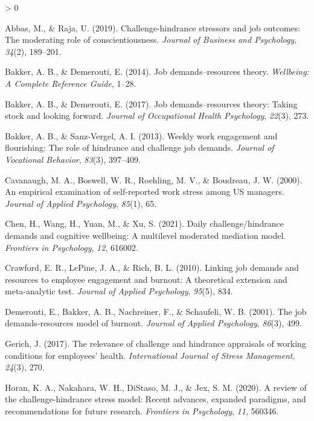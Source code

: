 \documentclass[
  english,
  man]{apa6}
\newlength{\cslhangindent}
\newenvironment{CSLReferences}[2] %
 {%
  \setlength{\parindent}{0pt}
  \ifodd #1 \everypar{\setlength{\hangindent}{\cslhangindent}}\ignorespaces\fi
  \ifnum #2 > 0
  \setlength{\parskip}{#2\baselineskip}
  \fi
 }%
 {}
\begin{document}
\hypertarget{refs}{}
\begin{CSLReferences}{1}{0}
\leavevmode\hypertarget{ref-abbas2019challenge}{}%
Abbas, M., \& Raja, U. (2019). Challenge-hindrance stressors and job outcomes: The moderating role of conscientiousness. \emph{Journal of Business and Psychology}, \emph{34}(2), 189--201.

\leavevmode\hypertarget{ref-bakker2014job}{}%
Bakker, A. B., \& Demerouti, E. (2014). Job demands--resources theory. \emph{Wellbeing: A Complete Reference Guide}, 1--28.

\leavevmode\hypertarget{ref-bakker2017job}{}%
Bakker, A. B., \& Demerouti, E. (2017). Job demands--resources theory: Taking stock and looking forward. \emph{Journal of Occupational Health Psychology}, \emph{22}(3), 273.

\leavevmode\hypertarget{ref-bakker2013weekly}{}%
Bakker, A. B., \& Sanz-Vergel, A. I. (2013). Weekly work engagement and flourishing: The role of hindrance and challenge job demands. \emph{Journal of Vocational Behavior}, \emph{83}(3), 397--409.

\leavevmode\hypertarget{ref-cavanaugh2000empirical}{}%
Cavanaugh, M. A., Boswell, W. R., Roehling, M. V., \& Boudreau, J. W. (2000). An empirical examination of self-reported work stress among US managers. \emph{Journal of Applied Psychology}, \emph{85}(1), 65.

\leavevmode\hypertarget{ref-chen2021daily}{}%
Chen, H., Wang, H., Yuan, M., \& Xu, S. (2021). Daily challenge/hindrance demands and cognitive wellbeing: A multilevel moderated mediation model. \emph{Frontiers in Psychology}, \emph{12}, 616002.

\leavevmode\hypertarget{ref-crawford2010linking}{}%
Crawford, E. R., LePine, J. A., \& Rich, B. L. (2010). Linking job demands and resources to employee engagement and burnout: A theoretical extension and meta-analytic test. \emph{Journal of Applied Psychology}, \emph{95}(5), 834.

\leavevmode\hypertarget{ref-demerouti2001job}{}%
Demerouti, E., Bakker, A. B., Nachreiner, F., \& Schaufeli, W. B. (2001). The job demands-resources model of burnout. \emph{Journal of Applied Psychology}, \emph{86}(3), 499.

\leavevmode\hypertarget{ref-gerich2017relevance}{}%
Gerich, J. (2017). The relevance of challenge and hindrance appraisals of working conditions for employees' health. \emph{International Journal of Stress Management}, \emph{24}(3), 270.

\leavevmode\hypertarget{ref-horan2020review}{}%
Horan, K. A., Nakahara, W. H., DiStaso, M. J., \& Jex, S. M. (2020). A review of the challenge-hindrance stress model: Recent advances, expanded paradigms, and recommendations for future research. \emph{Frontiers in Psychology}, \emph{11}, 560346.


\end{CSLReferences}
\end{document}
